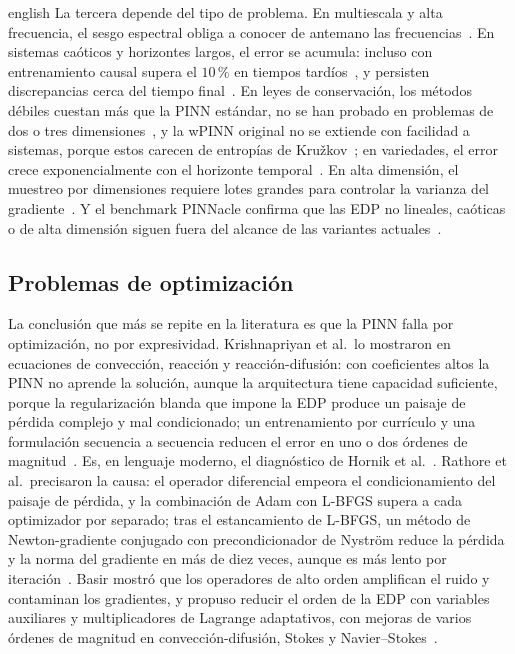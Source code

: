 \documentclass[0000.tex]{subfiles}
\begin{document}
\begin{hyphenrules}{english}
La tercera depende del tipo de problema. En multiescala y alta frecuencia, el sesgo espectral obliga a conocer de antemano las frecuencias~\cite{wang2021eigenvector}. En sistemas caóticos y horizontes largos, el error se acumula: incluso con entrenamiento causal supera el $10\,\%$ en tiempos tardíos~\cite{wang2022respecting}, y persisten discrepancias cerca del tiempo final~\cite{wang2023expert}. En leyes de conservación, los métodos débiles cuestan más que la PINN estándar, no se han probado en problemas de dos o tres dimensiones~\cite{de2024wpinns,chaumet2024improving}, y la wPINN original no se extiende con facilidad a sistemas, porque estos carecen de entropías de Kružkov~\cite{de2024wpinns}; en variedades, el error crece exponencialmente con el horizonte temporal~\cite{zhou2025weak}. En alta dimensión, el muestreo por dimensiones requiere lotes grandes para controlar la varianza del gradiente~\cite{hu2024tackling}. Y el benchmark PINNacle confirma que las EDP no lineales, caóticas o de alta dimensión siguen fuera del alcance de las variantes actuales~\cite{hao2024pinnacle}.

\subsection{Problemas de optimización}
\label{subsec:ea-opt}

La conclusión que más se repite en la literatura es que la PINN falla por optimización, no por expresividad. Krishnapriyan et al.\ lo mostraron en ecuaciones de convección, reacción y reacción-difusión: con coeficientes altos la PINN no aprende la solución, aunque la arquitectura tiene capacidad suficiente, porque la regularización blanda que impone la EDP produce un paisaje de pérdida complejo y mal condicionado; un entrenamiento por currículo y una formulación secuencia a secuencia reducen el error en uno o dos órdenes de magnitud~\cite{krishnapriyan2021characterizing}. Es, en lenguaje moderno, el diagnóstico de Hornik et al.~\cite{hornik1989multilayer}. Rathore et al.\ precisaron la causa: el operador diferencial empeora el condicionamiento del paisaje de pérdida, y la combinación de Adam con L-BFGS supera a cada optimizador por separado; tras el estancamiento de L-BFGS, un método de Newton-gradiente conjugado con precondicionador de Nyström reduce la pérdida y la norma del gradiente en más de diez veces, aunque es más lento por iteración~\cite{rathore2024challenges}. Basir mostró que los operadores de alto orden amplifican el ruido y contaminan los gradientes, y propuso reducir el orden de la EDP con variables auxiliares y multiplicadores de Lagrange adaptativos, con mejoras de varios órdenes de magnitud en convección-difusión, Stokes y Navier--Stokes~\cite{basir2022investigating}.


\end{hyphenrules}
\end{document}
